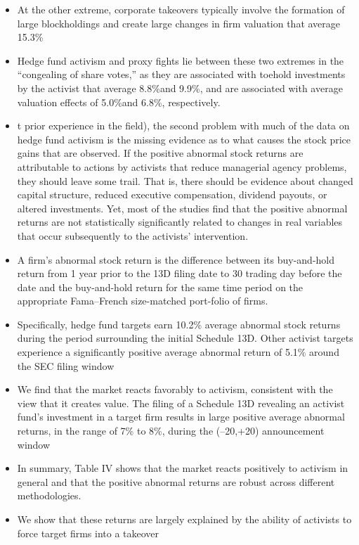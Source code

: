 \documentclass[12pt]{article}
\begin{document}
\begin{itemize}
        \item At the other extreme, corporate takeovers typically involve the formation of large blockholdings and create large changes in firm valuation that average 15.3\% \citep{Denes2017}

        \item Hedge fund activism and proxy fights lie between these two extremes in the “congealing of share votes,” as they are associated with toehold investments by the activist that average 8.8\%and 9.9\%, and are associated with average valuation effects of 5.0\%and 6.8\%, respectively.\citep{Denes2017}

        \item t prior experience in the field), the second problem with much of the data on hedge fund activism is the missing evidence as to what causes the stock price gains that are observed. If the positive abnormal stock returns are attributable to actions by activists that reduce managerial agency problems, they should leave some trail. That is, there should be evidence about changed capital structure, reduced executive compensation, dividend payouts, or altered investments. Yet, most of the studies find that the positive abnormal returns are not statistically significantly related to changes in real variables that occur subsequently to the activists’ intervention. \citep{CoffeeJr.2014}

        \item A firm’s abnormal stock return is the difference between its buy-and-hold return from 1 year prior to the 13D filing date to 30 trading day before the date and the buy-and-hold return for the same time period on the appropriate Fama–French size-matched port-folio of firms. \citep{Klein2009}

        \item Specifically, hedge fund targets earn 10.2\% average abnormal stock returns during the period surrounding the initial Schedule 13D. Other activist targets experience a significantly positive average abnormal return of 5.1\% around the SEC filing window \citep{Klein2009}

        \item We find that the market reacts favorably to activism, consistent with the view that it creates value. The filing of a Schedule 13D revealing an activist fund’s investment in a target firm results in large positive average abnormal returns, in the range of 7\% to 8\%, during the (–20,+20) announcement window \citep{Brav2008}

        \item In summary, Table IV shows that the market reacts positively to activism in general and that the positive abnormal returns are robust across different methodologies. \citep{Klein2009}

        \item We show that these returns are largely explained by the ability of activists to force target firms into a takeover \citep{Greenwood2009}

    \end{itemize}
\end{document}
